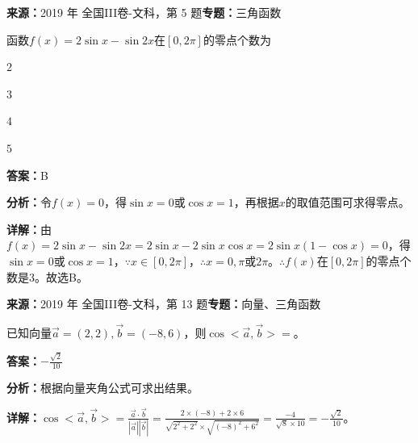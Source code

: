\begin{question}[points=5]
\textbf{来源：}2019 年 全国III卷-文科，第 5 题\quad \textbf{专题：}三角函数\par
函数$f(x)=2\sin x-\sin 2x$在$[0,2\pi]$的零点个数为
\begin{choices}
  \item $2$
  \item $3$
  \item $4$
  \item $5$
\end{choices}
\begin{solution}
\textbf{答案：}B

\textbf{分析：}令$f(x)=0$，得$\sin x=0$或$\cos x=1$，再根据$x$的取值范围可求得零点。

\textbf{详解：}由$f(x)=2\sin x-\sin2x=2\sin x-2\sin x\cos x=2\sin x(1-\cos x)=0$，得$\sin x=0$或$\cos x=1$，$\because x\in[0,2\pi]$，$\therefore x=0,\pi$或$2\pi$。$\therefore f(x)$在$[0,2\pi]$的零点个数是3。故选B。
\end{solution}
\end{question}

\begin{question}[points=5]
\textbf{来源：}2019 年 全国III卷-文科，第 13 题\quad \textbf{专题：}向量、三角函数\par
已知向量$\vec{a}=(2,2),\vec{b}=(-8,6)$，则$\cos<\vec{a},\vec{b}>=$。
\begin{solution}
\textbf{答案：}$-\frac{\sqrt{2}}{10}$

\textbf{分析：}根据向量夹角公式可求出结果。

\textbf{详解：}$\cos<\vec{a},\vec{b}>=\frac{\vec{a}\cdot\vec{b}}{|\vec{a}||\vec{b}|}=\frac{2\times(-8)+2\times6}{\sqrt{2^2+2^2}\times\sqrt{(-8)^2+6^2}}=\frac{-4}{\sqrt{8}\times10}=-\frac{\sqrt{2}}{10}$。
\end{solution}
\end{question}

